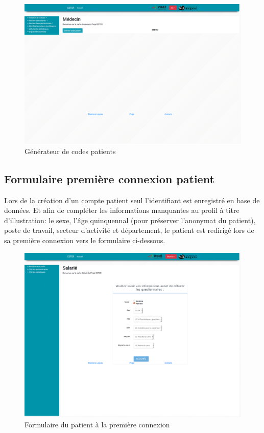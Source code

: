 \begin{figure}[H]
    \begin{center}
	\includegraphics[scale=0.25]{img/connexion/medecin}
    \end{center}
    \caption{Générateur de codes patients}
\end{figure}

\subsection{Formulaire première connexion patient}

Lors de la création d’un compte patient seul l’identifiant est enregistré en base de données. Et afin de compléter les informations manquantes au profil à titre d'illustration: le sexe, l’âge quinquennal (pour préserver l’anonymat du patient), poste de travail, secteur d’activité et département, le patient est redirigé lors de sa première connexion vers le formulaire ci-dessous.

\begin{figure}[H]
    \begin{center}
	\includegraphics[scale=0.25]{img/connexion/formPatient}
    \end{center}
    \caption{Formulaire du patient à la première connexion}
\end{figure}
